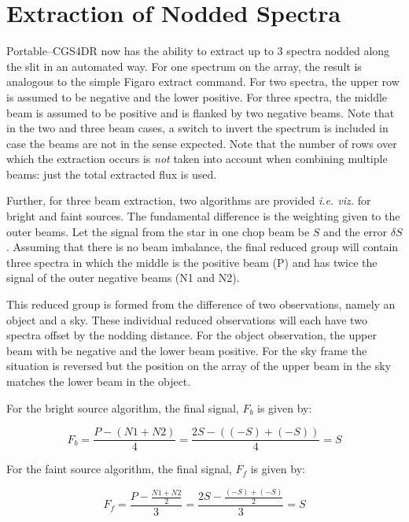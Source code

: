 \documentclass[a4paper]{book}
\renewcommand{\_}{{\tt\char'137}}
\begin{document}
\section{Extraction of Nodded Spectra}
Portable--CGS4DR now has the ability to extract up to 3 spectra nodded
along the slit in an automated way. For one spectrum on the array, the
result is analogous to the simple Figaro {\sc extract} command. For two
spectra, the upper row is assumed to be negative and the lower positive.
For three spectra, the middle beam is assumed to be positive and is
flanked by two negative beams. Note that in the two and three beam cases,
a switch to invert the spectrum is included in case the beams are not in
the sense expected.  Note that the number of rows over which the extraction
occurs is {\em not} taken into account when combining multiple beams: just
the total extracted flux is used.

Further, for three beam extraction, two algorithms are provided {\em i.e.
viz.} for bright and faint sources. The fundamental difference is the
weighting given to the outer beams. Let the signal from the star in one
chop beam be $S$ and the error $\delta S$. Assuming that there is no beam
imbalance, the final reduced group will contain three spectra in which the
middle is the positive beam (P) and has twice the signal of the outer
negative beams (N1 and N2).

This reduced group is formed from the difference of two observations,
namely an {\sc object} and a {\sc sky}. These individual reduced
observations will each have two spectra offset by the nodding distance.
For the {\sc object} observation, the upper beam with be negative and the
lower beam positive. For the {\sc sky} frame the situation is reversed but
the position on the array of the upper beam in the {\sc sky} matches the
lower beam in the {\sc object}.

For the bright source algorithm, the final signal, $F_{b}$ is given by:

\begin{equation}
  F_{b} = \frac{P-(N1+N2)}{4} = \frac{2S-((-S)+(-S))}{4} = S
\label{equation_8}
\end{equation}

For the faint source algorithm, the final signal, $F_{f}$ is given by:

\begin{equation}
  F_{f} = \frac{ P-\frac{ N1+N2 }{ 2 } }{ 3 } =
   \frac{2S-\frac{ (-S)+(-S) }{ 2 }}{ 3 } = S
\label{equation_9}
\end{equation}
\end{document}
